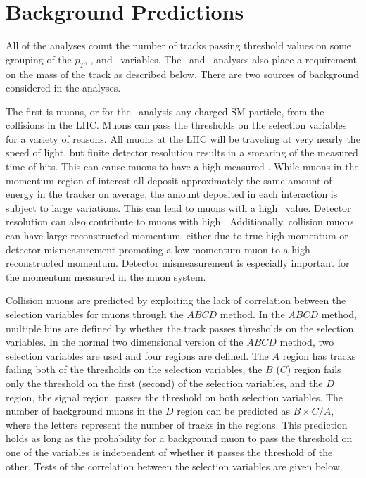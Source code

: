\section{Background Predictions \label{BackPred}}
All of the analyses count the number of tracks passing threshold values on some grouping of the $p_T$, \invbeta, 
and \ias\ variables. The \tktof\  and \tkonly\ analyses also place a requirement on the mass of the track as described below. There are two sources
of background considered in the analyses. 

The first is muons, or for the \tkonly\ analysis any charged SM particle, from the collisions in the LHC. Muons can pass the thresholds on the selection variables
for a variety of reasons.
All muons at the LHC will be traveling at very nearly the speed of light,
but finite detector resolution results in a smearing of the measured time of hits. This can cause muons to have a high measured \invbeta.
While muons in the momentum region of interest all deposit approximately
the same amount of energy in the tracker on average, the amount deposited in each interaction is subject to large variations. This can lead to muons
with a high \dedx\ value. Detector resolution can also contribute to muons with high \dedx.
Additionally, collision muons can have large reconstructed momentum, either due to true high momentum or detector mismeasurement
promoting a low momentum muon to a high reconstructed momentum. Detector mismeasurement is especially important for the momentum measured in the muon system.

Collision muons are predicted by exploiting the lack of correlation between the selection variables for muons through the $ABCD$ method.
In the $ABCD$ method, multiple bins are defined by whether the track passes thresholds on the selection variables. In the normal two dimensional version
of the $ABCD$ method, two selection variables are used and four regions are defined. The $A$ region has tracks failing both of the thresholds on the selection
variables, the $B$ ($C$) region fails only the threshold on the first (second) of the selection variables, and the $D$ region,
the signal region, passes the threshold on both selection
variables. The number of background muons in the $D$ region can be predicted as $B \times C / A$, where the letters represent the number of tracks in the regions.
This prediction holds as long as the probability for a background
muon to pass the threshold on one of the variables is independent of whether it passes the threshold of the other. Tests of the correlation between the selection variables are
given below.

